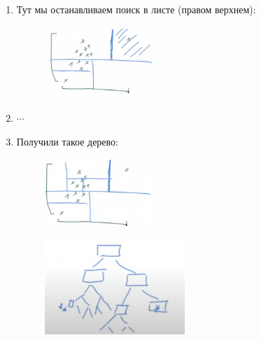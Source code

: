 \begin{itemize}
\begin{itemize}
\begin{enumerate}
                                \item Тут мы останавливаем поиск в листе (правом верхнем):
                                \begin{figure}[H]
                                    \centering
                                    \includegraphics[width=0.4\textwidth]{images/19lecture/isolation_forest_iter_2.png}
                                \end{figure}

                                \item $\cdots$

                                \item Получили такое дерево:
                                    \begin{figure}[H]
                                        \centering
                                        \includegraphics[width=0.4\textwidth]{images/19lecture/isolation_forest_iter_3.png}
                                    \end{figure}

                                    \begin{figure}[H]
                                        \centering
                                        \includegraphics[width=0.5\textwidth]{images/19lecture/isolation_forest_tree.png}
                                    \end{figure}


\end{enumerate}
\end{itemize}
\end{itemize}
